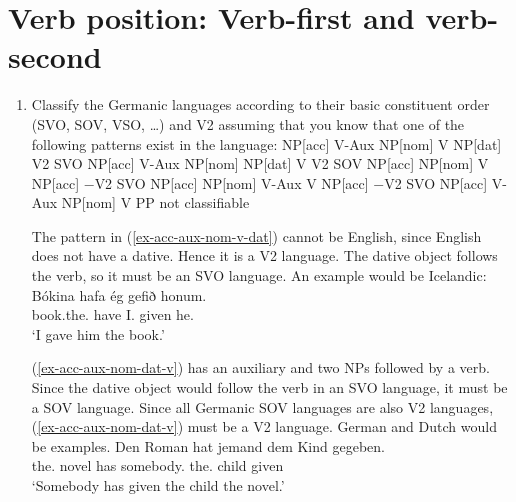 \section{Verb position: Verb-first and verb-second}



\begin{enumerate}
\item Classify the Germanic languages according to their basic constituent order (SVO, SOV, VSO,
  \ldots) and V2 assuming that you know that one of the following patterns exist in the language:
\eal
\label{ex-v2-task-solution}
\ex 
\label{ex-acc-aux-nom-v-dat}
NP[acc] V-Aux NP[nom] V NP[dat]   \hfill  V2 SVO 
\ex
\label{ex-acc-aux-nom-dat-v} 
NP[acc] V-Aux NP[nom] NP[dat] V   \hfill  V2 SOV
\ex 
\label{ex-acc-nom-v-acc}
NP[acc] NP[nom] V NP[acc]         \hfill $-$V2 SVO
\ex 
\label{ex-acc-nom-aux-v-acc}
NP[acc] NP[nom] V-Aux V NP[acc]   \hfill $-$V2 SVO
\ex 
\label{ex-acc-aux-nom-v-pp}
NP[acc] V-Aux NP[nom] V PP        \hfill not classifiable
\zl

The pattern in (\ref{ex-acc-aux-nom-v-dat}) cannot be English, since English does not have a dative. Hence it is a V2
language. The dative object follows the verb, so it must be an SVO language. An example would be Icelandic:
\ea
\gll Bókina          hafa ég       gefið honum.\\
     book.the.\ACC{} have I.\NOM{} given he.\DAT\\\icelandic
\glt `I gave him the book.'
\z

(\ref{ex-acc-aux-nom-dat-v}) has an auxiliary and two NPs followed by a verb. Since the dative object would follow the verb
in an SVO language, it must be a SOV language. Since all Germanic SOV languages are also V2
languages, (\ref{ex-acc-aux-nom-dat-v}) must be a V2 language. German and Dutch would be examples.
\ea
\gll Den Roman hat jemand dem Kind gegeben.\\
     the.\ACC{} novel has somebody.\NOM{} the.\DAT{} child given\\
\glt `Somebody has given the child the novel.'
\z


\end{enumerate}
